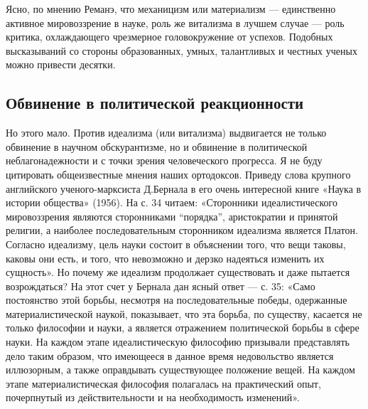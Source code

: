 Ясно, по мнению Реманэ, что механицизм или материализм --- единственно
активное мировоззрение в науке, роль же витализма в лучшем случае ---
роль критика, охлаждающего чрезмерное головокружение от успехов.
Подобных высказываний со стороны образованных, умных, талантливых и
честных ученых можно привести десятки.
%

\subsection{Обвинение в политической реакционности}

Но этого мало. Против идеализма (или витализма) выдвигается не только
обвинение в научном обскурантизме, но и обвинение в политической
неблагонадежности и с точки зрения человеческого прогресса. Я не буду
цитировать общеизвестные мнения наших ортодоксов. Приведу слова
крупного английского ученого-марксиста Д.Бернала в его очень
интересной книге «Наука в истории общества» (1956). На с. 34 читаем:
«Сторонники идеалистического мировоззрения являются сторонниками
``порядка'', аристократии и принятой религии, а наиболее
последовательным сторонником идеализма является Платон. Согласно
идеализму, цель науки состоит в объяснении того, что вещи таковы,
каковы они есть, и того, что невозможно и дерзко надеяться изменить их
сущность». Но почему же идеализм продолжает существовать и даже
пытается возрождаться? На этот счет у Бернала дан ясный ответ --- с.
35: «Само постоянство этой борьбы, несмотря на последовательные
победы, одержанные материалистической наукой, показывает, что эта
борьба, по существу, касается не только философии и науки, а является
отражением политической борьбы в сфере науки. На каждом этапе
идеалистическую философию призывали представлять дело таким образом,
что имеющееся в данное время недовольство является иллюзорным, а также
оправдывать существующее положение вещей. На каждом этапе
материалистическая философия полагалась на практический опыт,
почерпнутый из действительности и на необходимость изменений».

